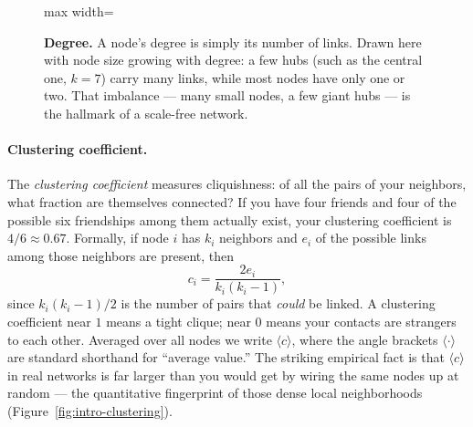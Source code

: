 \begin{figure}[t]
\centering
\begin{adjustbox}{max width=\linewidth}\end{adjustbox}
\caption{\textbf{Degree.} A node's degree is simply its number of links. Drawn
here with node size growing with degree: a few hubs (such as the central one,
$k=7$) carry many links, while most nodes have only one or two. That imbalance ---
many small nodes, a few giant hubs --- is the hallmark of a scale-free
network.}
\label{fig:intro-degree}
\end{figure}

\paragraph{Clustering coefficient.}
The \emph{clustering coefficient} measures cliquishness: of all the pairs of your
neighbors, what fraction are themselves connected? If you have four friends and
four of the possible six friendships among them actually exist, your clustering
coefficient is $4/6 \approx 0.67$. Formally, if node $i$ has $k_i$ neighbors and
$e_i$ of the possible links among those neighbors are present, then
\begin{equation}
  c_i = \frac{2 e_i}{k_i (k_i - 1)},
  \label{eq:intro-clustering}
\end{equation}
since $k_i(k_i-1)/2$ is the number of pairs that \emph{could} be linked. A
clustering coefficient near $1$ means a tight clique; near $0$ means your
contacts are strangers to each other. Averaged over all nodes we write $\langle
c\rangle$, where the angle brackets $\langle\cdot\rangle$ are standard shorthand
for ``average value.'' The striking empirical fact \citep{watts1998} is that
$\langle c\rangle$ in real networks is far larger than you would get by wiring
the same nodes up at random --- the quantitative fingerprint of those dense local
neighborhoods (Figure~\ref{fig:intro-clustering}).


